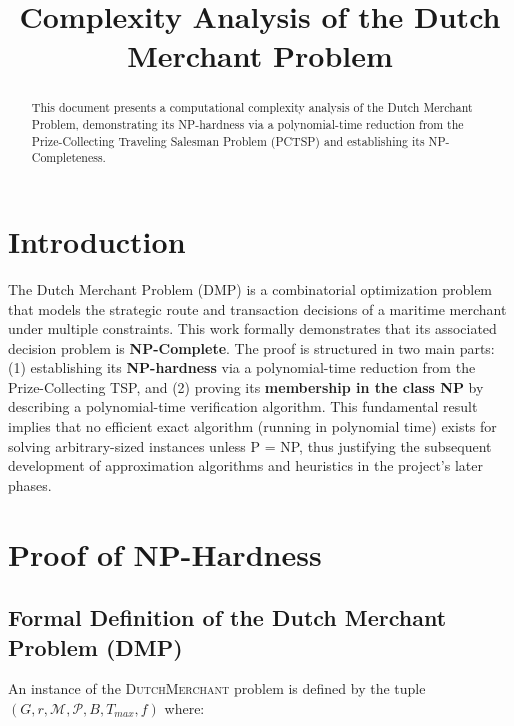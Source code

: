 \documentclass{article} \usepackage[english]{babel} \usepackage[utf8]{inputenc}
\title{Complexity Analysis of the Dutch Merchant Problem} \author{} \date{}
\begin{document}
\maketitle

\begin{abstract} This document presents a computational complexity analysis of
the Dutch Merchant Problem, demonstrating its NP-hardness via a polynomial-time
reduction from the Prize-Collecting Traveling Salesman Problem (PCTSP) and
establishing its NP-Completeness. \end{abstract}

\section{Introduction} \label{sec:introduction}

The Dutch Merchant Problem (DMP) is a combinatorial optimization problem that
models the strategic route and transaction decisions of a maritime merchant
under multiple constraints. This work formally demonstrates that its associated
decision problem is \textbf{NP-Complete}. The proof is structured in two main
parts: (1) establishing its \textbf{NP-hardness} via a polynomial-time reduction
from the Prize-Collecting TSP, and (2) proving its \textbf{membership in the
class NP} by describing a polynomial-time verification algorithm. This
fundamental result implies that no efficient exact algorithm (running in
polynomial time) exists for solving arbitrary-sized instances unless P = NP,
thus justifying the subsequent development of approximation algorithms and
heuristics in the project's later phases.

\section{Proof of NP-Hardness} \label{sec:np-hardness}

\subsection{Formal Definition of the Dutch Merchant Problem (DMP)}
\label{subsec:def_dmp}

An instance of the \textsc{DutchMerchant} problem is defined by the tuple $(G,
r, \mathcal{M}, \mathcal{P}, B, T_{max}, f)$ where:
\end{document}
